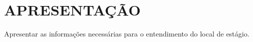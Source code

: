 \chapter{APRESENTAÇÃO} %
\label{chap:apresentação}

Apresentar as informações necessárias para o entendimento do local de estágio.